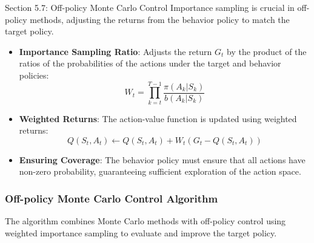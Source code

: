 \begin{notes}{Section 5.7: Off-policy Monte Carlo Control}
    Importance sampling is crucial in off-policy methods, adjusting the returns from the behavior policy to match the target policy.
    
    \begin{highlight}
    
        \begin{itemize}
            \item \textbf{Importance Sampling Ratio}: Adjusts the return $G_t$ by the product of the ratios of the probabilities of the actions under the target and behavior policies:
            \[
            W_t = \prod_{k=t}^{T-1} \frac{\pi(A_k|S_k)}{b(A_k|S_k)}
            \]
            \item \textbf{Weighted Returns}: The action-value function is updated using weighted returns:
            \[
            Q(S_t, A_t) \leftarrow Q(S_t, A_t) + W_t (G_t - Q(S_t, A_t))
            \]
            \item \textbf{Ensuring Coverage}: The behavior policy must ensure that all actions have non-zero probability, guaranteeing sufficient exploration of the action space.
        \end{itemize}
    
    \end{highlight}
    
    \subsubsection*{Off-policy Monte Carlo Control Algorithm}
    
    The algorithm combines Monte Carlo methods with off-policy control using weighted importance sampling to evaluate and improve the target policy.
    
    \begin{highlight}
    

\end{highlight}
\end{notes}
